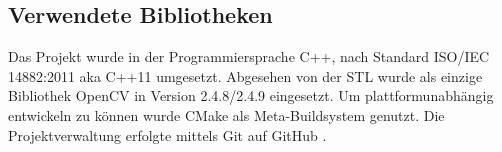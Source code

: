 \documentclass[conference]{IEEEtran}
\begin{document}
\subsection{Verwendete Bibliotheken}

Das Projekt wurde in der Programmiersprache C++, nach Standard ISO/IEC 14882:2011 aka C++11 umgesetzt. Abgesehen von der STL wurde als einzige Bibliothek OpenCV \cite{opencv} in Version 2.4.8/2.4.9 eingesetzt. Um plattformunabhängig entwickeln zu können wurde CMake \cite{cmake} als Meta-Buildsystem genutzt. Die Projektverwaltung erfolgte mittels Git \cite{git} auf GitHub \cite{github}.

%
%



%
%
\end{document}

